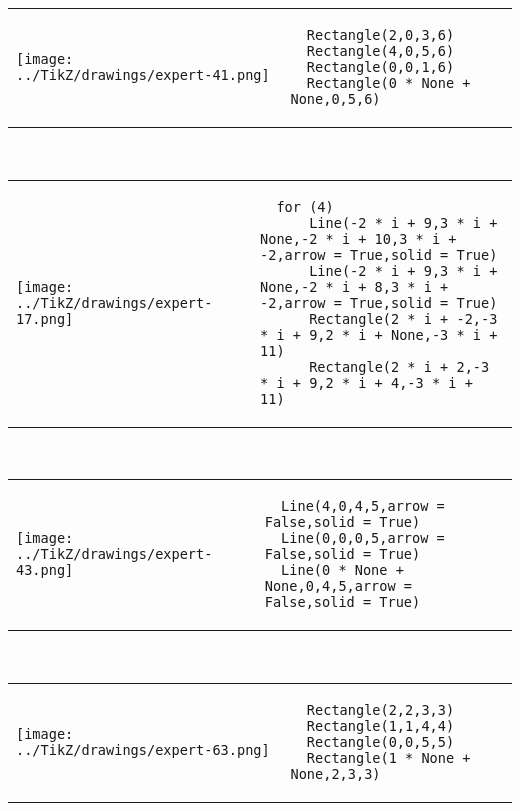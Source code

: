 
        \begin{tabular}{ll}
\texttt{[image: ../TikZ/drawings/expert-41.png]}&
        \begin{minipage}{10cm}
        \begin{verbatim}
  Rectangle(2,0,3,6)
  Rectangle(4,0,5,6)
  Rectangle(0,0,1,6)
  Rectangle(0 * None + None,0,5,6)
        \end{verbatim}
\end{minipage}
\end{tabular}        
        \\

        \begin{tabular}{ll}
\texttt{[image: ../TikZ/drawings/expert-17.png]}&
        \begin{minipage}{10cm}
        \begin{verbatim}
  for (4)
      Line(-2 * i + 9,3 * i + None,-2 * i + 10,3 * i + -2,arrow = True,solid = True)
      Line(-2 * i + 9,3 * i + None,-2 * i + 8,3 * i + -2,arrow = True,solid = True)
      Rectangle(2 * i + -2,-3 * i + 9,2 * i + None,-3 * i + 11)
      Rectangle(2 * i + 2,-3 * i + 9,2 * i + 4,-3 * i + 11)
        \end{verbatim}
\end{minipage}
\end{tabular}        
        \\

        \begin{tabular}{ll}
\texttt{[image: ../TikZ/drawings/expert-43.png]}&
        \begin{minipage}{10cm}
        \begin{verbatim}
  Line(4,0,4,5,arrow = False,solid = True)
  Line(0,0,0,5,arrow = False,solid = True)
  Line(0 * None + None,0,4,5,arrow = False,solid = True)
        \end{verbatim}
\end{minipage}
\end{tabular}        
        \\

        \begin{tabular}{ll}
\texttt{[image: ../TikZ/drawings/expert-63.png]}&
        \begin{minipage}{10cm}
        \begin{verbatim}
  Rectangle(2,2,3,3)
  Rectangle(1,1,4,4)
  Rectangle(0,0,5,5)
  Rectangle(1 * None + None,2,3,3)
        \end{verbatim}
\end{minipage}
\end{tabular}        
        \\

